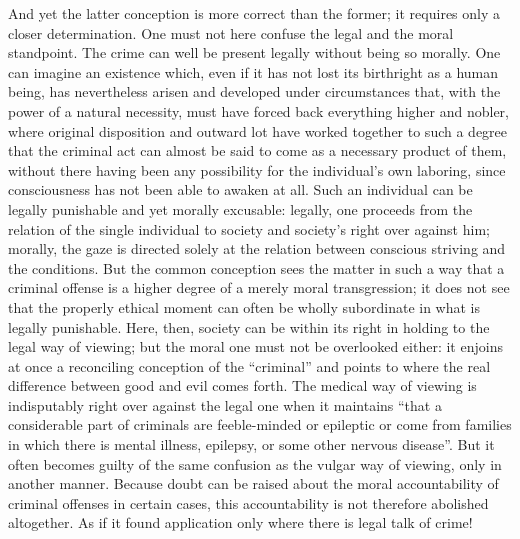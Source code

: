 \documentclass[12pt,a4paper,openany]{book}
\newcommand{\opage}[1]{\marginnote{\footnotesize\textit{[#1]}}}
\begin{document}
And yet the latter conception is more correct than the former;
it requires only a closer determination. One must not here
confuse the legal and the moral standpoint.
The crime can well be present legally without being
so morally. One can imagine an existence which, even if it
has not lost its birthright as a human being, has nevertheless
arisen and developed under circumstances that, with the power of a natural
necessity, must have forced back everything higher and
nobler, where original disposition and outward lot have
worked together to such a degree that the criminal act can almost
be said to come as a necessary product of them, without
there having been any possibility for the individual's own laboring,
since consciousness has not been able to awaken at all. Such
an individual can be legally punishable and yet morally
\opage{332}excusable: legally, one proceeds from the relation of the single individual
to society and society's right over against him; morally, the
gaze is directed solely at the relation between conscious striving and
the conditions. But the common conception sees the matter
in such a way that a criminal offense is a higher degree of a
merely moral transgression; it does not see that the properly ethical
moment can often be wholly subordinate in what is legally
punishable. Here, then, society can be within its right in
holding to the legal way of viewing; but the moral one
must not be overlooked either: it enjoins at once a reconciling
conception of the ``criminal'' and points to where
the real difference between good and evil comes forth.
The medical way of viewing is indisputably right over against
the legal one when it maintains ``that a considerable part of
criminals are feeble-minded or epileptic or come from
families in which there is mental illness, epilepsy, or some
other nervous disease''. But it often becomes guilty of the same
confusion as the vulgar way of viewing, only
in another manner. Because doubt can be raised about the moral
accountability of criminal offenses in certain cases, this
accountability is not therefore abolished altogether. As if
it found application only where there is legal talk of
crime!
\end{document}
